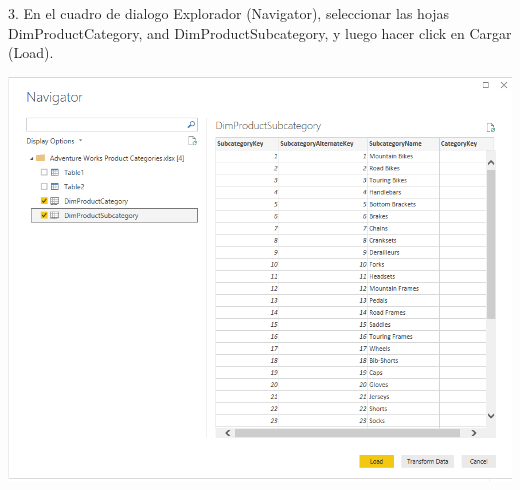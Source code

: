 \begin{flushleft}
\begin{itemize}
\textbf{ }\\
\textbf{ }\\
\textbf{ }\\
\textbf{ }\\
\textbf{ }\\
\textbf{ }\\
\textbf{ }\\
\textbf{ }\\
\textbf{ }\\
\textbf{ }\\
\textbf{ }\\
\textbf{ }\\
\textbf{ }\\
\textbf{ }\\
\textbf{ }\\
\textbf{ }\\
\textbf{ }\\
\textbf{ }\\
\textbf{ }\\
3. En el cuadro de dialogo Explorador (Navigator), seleccionar las hojas DimProductCategory, and
DimProductSubcategory, y luego hacer click en Cargar (Load).
\textbf{ }\\
\begin{center}
	\includegraphics[width=20cm]{./Imagenes/img21} 
	\end{center}
\textbf{ }\\
\textbf{ }\\
\textbf{ }\\
\textbf{ }\\
\textbf{ }\\

\end{itemize}
\end{flushleft}

